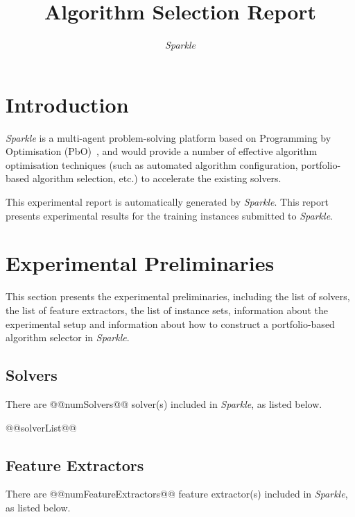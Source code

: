\documentclass[british]{article}
\title{Algorithm Selection Report}
\author{ \emph{Sparkle} }
\newif\iftest
\begin{document}
\maketitle %


\section{Introduction}
\label{sec:Introduction}

\emph{Sparkle} \cite{Hoos15} is a multi-agent problem-solving platform based on Programming by Optimisation (PbO)~\cite{Hoos12}, and would provide a number of effective algorithm optimisation techniques (such as automated algorithm configuration, portfolio-based algorithm selection, etc.) to accelerate the existing solvers.

This experimental report is automatically generated by \emph{Sparkle}. This report presents experimental results for the training instances submitted to \emph{Sparkle}\iftest, as well as for running the \emph{Sparkle} portfolio selector to solve the test instances in the instance set @@testInstanceClass@@\fi.

\section{Experimental Preliminaries}
\label{sec:Experimental_Preliminaries}

This section presents the experimental preliminaries, including the list of solvers, the list of feature extractors, the list of instance sets, information about the experimental setup and information about how to construct a portfolio-based algorithm selector in \emph{Sparkle}.

\subsection{Solvers}
\label{sec:Solvers}
There are @@numSolvers@@ solver(s) included in \emph{Sparkle}, as listed below.

\begin{enumerate} 
@@solverList@@
\end{enumerate}

\subsection{Feature Extractors}
\label{sec:Feature_Extractors}
There are @@numFeatureExtractors@@ feature extractor(s) included in \emph{Sparkle}, as listed below.
\end{document}
